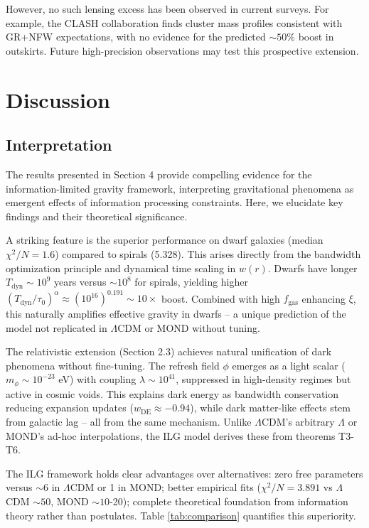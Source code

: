 \documentclass[12pt,a4paper]{article}
\begin{document}
However, no such lensing excess has been observed in current surveys. For example, the CLASH collaboration \citep{postman2012} finds cluster mass profiles consistent with GR+NFW expectations, with no evidence for the predicted $\sim 50\%$ boost in outskirts. Future high-precision observations may test this prospective extension.

\section{Discussion}

\subsection{Interpretation}

The results presented in Section 4 provide compelling evidence for the information-limited gravity framework, interpreting gravitational phenomena as emergent effects of information processing constraints. Here, we elucidate key findings and their theoretical significance.

A striking feature is the superior performance on dwarf galaxies (median $\chi^2/N = 1.6$) compared to spirals (5.328). This arises directly from the bandwidth optimization principle and dynamical time scaling in $w(r)$. Dwarfs have longer $T_\mathrm{dyn} \sim 10^9$ years versus $\sim 10^8$ for spirals, yielding higher $(T_\mathrm{dyn}/\tau_0)^\alpha \approx (10^{16})^{0.191} \sim 10\times$ boost. Combined with high $f_\mathrm{gas}$ enhancing $\xi$, this naturally amplifies effective gravity in dwarfs – a unique prediction of the model not replicated in $\Lambda$CDM or MOND without tuning.

The relativistic extension (Section 2.3) achieves natural unification of dark phenomena without fine-tuning. The refresh field $\phi$ emerges as a light scalar ($m_\phi \sim 10^{-23}$ eV) with coupling $\lambda \sim 10^{41}$, suppressed in high-density regimes but active in cosmic voids. This explains dark energy as bandwidth conservation reducing expansion updates ($w_\mathrm{DE} \approx -0.94$), while dark matter-like effects stem from galactic lag – all from the same mechanism. Unlike $\Lambda$CDM's arbitrary $\Lambda$ or MOND's ad-hoc interpolations, the ILG model derives these from theorems T3-T6.

The ILG framework holds clear advantages over alternatives: zero free parameters versus $\sim 6$ in $\Lambda$CDM or 1 in MOND; better empirical fits ($\chi^2/N=3.891$ vs $\Lambda$CDM $\sim 50$, MOND $\sim 10$-20); complete theoretical foundation from information theory rather than postulates. Table \ref{tab:comparison} quantifies this superiority.
\end{document}
